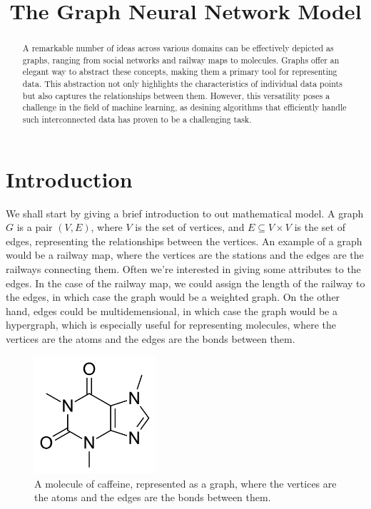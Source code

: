 \documentclass[12pt]{article}
\begin{document}
\title{The Graph Neural Network Model}

\maketitle

\begin{abstract}
    A remarkable number of ideas across various domains can be effectively
    depicted as graphs, ranging from social networks and railway maps to
    molecules. Graphs offer an elegant way to abstract these concepts, making
    them a primary tool for representing data. This abstraction not only
    highlights the characteristics of individual data points but also captures
    the relationships between them. However, this versatility poses a challenge
    in the field of machine learning, as desining algorithms that efficiently
    handle such interconnected data has proven to be a challenging task.
\end{abstract}

\section{Introduction}
      We  shall  start  by  giving a brief introduction to out mathematical model. A
    graph  $G$  is  a  pair  $(V,  E)$,  where  $V$  is  the set of vertices, and $E
    \subseteq  V  \times  V$  is  the  set  of edges, representing the relationships
    between  the  vertices.  An  example  of  a  graph would be a railway map, where
    the  vertices  are  the  stations  and  the  edges  are  the railways connecting
    them.  Often  we're  interested  in  giving some attributes to the edges. In the
    case  of  the  railway  map,  we  could  assign the length of the railway to the
    edges,  in  which  case  the graph would be a weighted graph. On the other hand,
    edges   could   be  multidemensional,  in  which  case  the  graph  would  be  a
    hypergraph,  which  is  especially  useful for representing molecules, where the
    vertices are the atoms and the edges are the bonds between them.

     \begin{figure}[h]
         \centering
         \includegraphics[width=0.4\textwidth]{img/Caffeine_structure.png}
           \caption{A   molecule   of  caffeine,  represented  as  a  graph,  where  the
        vertices are the atoms and the edges are the bonds between them.}
         \label{fig:graph}
     \end{figure}
    
\end{document}
